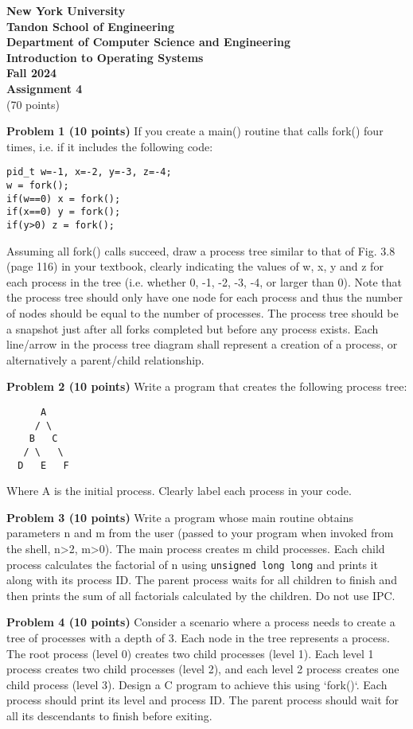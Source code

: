 \documentclass{article}
\begin{document}
\textbf{New York University} \\
\textbf{Tandon School of Engineering} \\
\textbf{Department of Computer Science and Engineering} \\
\textbf{Introduction to Operating Systems} \\
\textbf{Fall 2024} \\
\textbf{Assignment 4} \\
(70 points)

\textbf{Problem 1 (10 points)} If you create a main() routine that calls fork() four times, i.e. if it includes the following code:
\begin{verbatim}
pid_t w=-1, x=-2, y=-3, z=-4;
w = fork();
if(w==0) x = fork();
if(x==0) y = fork();
if(y>0) z = fork();
\end{verbatim}
Assuming all fork() calls succeed, draw a process tree similar to that of Fig. 3.8 (page 116) in your textbook, clearly indicating the values of w, x, y and z for each process in the tree (i.e. whether 0, -1, -2, -3, -4, or larger than 0).
Note that the process tree should only have one node for each process and thus the number of nodes should be equal to the number of processes.
The process tree should be a snapshot just after all forks completed but before any process exists.
Each line/arrow in the process tree diagram shall represent a creation of a process, or alternatively a parent/child relationship.


\textbf{Problem 2 (10 points)} Write a program that creates the following process tree:

\begin{verbatim}
      A
     / \
    B   C
   / \   \
  D   E   F
\end{verbatim}
Where A is the initial process.  Clearly label each process in your code.


\textbf{Problem 3 (10 points)} Write a program whose main routine obtains parameters n and m from the user (passed to your program when invoked from the shell, n>2, m>0). The main process creates m child processes. Each child process calculates the factorial of n using \texttt{unsigned long long} and prints it along with its process ID. The parent process waits for all children to finish and then prints the sum of all factorials calculated by the children. Do not use IPC.


\textbf{Problem 4 (10 points)}  Consider a scenario where a process needs to create a tree of processes with a depth of 3. Each node in the tree represents a process. The root process (level 0) creates two child processes (level 1). Each level 1 process creates two child processes (level 2), and each level 2 process creates one child process (level 3).  Design a C program to achieve this using `fork()`.  Each process should print its level and process ID.  The parent process should wait for all its descendants to finish before exiting.
\end{document}
